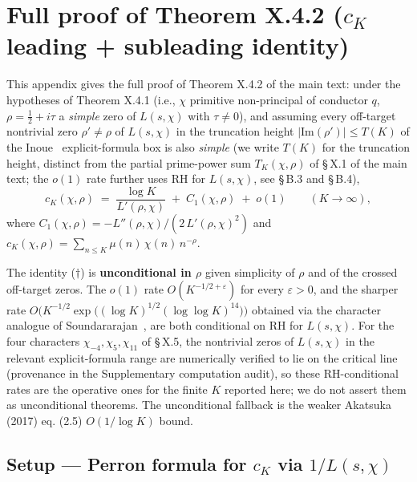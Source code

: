 \section{Full proof of Theorem X.4.2 ($c_K$ leading + subleading identity)}

This appendix gives the full proof of Theorem X.4.2 of the main text:
under the hypotheses of Theorem X.4.1 (i.e., \(\chi\) primitive
non-principal of conductor \(q\), \(\rho = \tfrac12 + i\tau\) a \emph{simple}
zero of \(L(s,\chi)\) with \(\tau \ne 0\)), and assuming every
off-target nontrivial zero \(\rho' \ne \rho\) of \(L(s,\chi)\) in the
truncation height \(|\mathrm{Im}(\rho')| \le T(K)\) of the Inoue~\cite{Inoue2021}
explicit-formula box is also \emph{simple} (we write \(T(K)\) for the
truncation height, distinct from the partial prime-power sum
\(T_K(\chi,\rho)\) of \S\,X.1 of the main text; the \(o(1)\) rate further
uses RH for \(L(s,\chi)\), see \S\,B.3 and \S\,B.4),
\begin{equation}
\label{eq:cK-appendix}
c_K(\chi,\rho) \;=\; \frac{\log K}{L'(\rho,\chi)} \;+\; C_1(\chi,\rho) \;+\; o(1)
\qquad (K \to \infty),
\tag{$\dagger$}
\end{equation}
where \(C_1(\chi,\rho) = -L''(\rho,\chi) / (2\,L'(\rho,\chi)^2)\) and
\(c_K(\chi,\rho) = \sum_{n \le K} \mu(n)\,\chi(n)\,n^{-\rho}\).

The identity (\(\dagger\)) is \textbf{unconditional in \(\rho\)} given
simplicity of \(\rho\) and of the crossed off-target zeros. The \(o(1)\) rate
\(O(K^{-1/2 + \varepsilon})\) for every \(\varepsilon > 0\), and the
sharper rate
\(O\bigl(K^{-1/2} \exp\bigl((\log K)^{1/2}(\log\log K)^{14}\bigr)\bigr)\)
obtained via the character analogue of Soundararajan~\cite[Theorem~1]{Soundararajan2009},
are both conditional on RH for \(L(s, \chi)\). For the four characters
\(\chi_{-4}, \chi_5, \chi_{11}\) of \S\,X.5, the nontrivial zeros of
\(L(s,\chi)\) in the relevant explicit-formula range are numerically
verified to lie on the critical line (provenance in the Supplementary
computation audit), so these RH-conditional rates are the operative
ones for the finite \(K\) reported here; we do not assert them as
unconditional theorems. The unconditional fallback is the weaker
Akatsuka (2017) eq. (2.5) \(O(1/\log K)\) bound.

\subsection{Setup --- Perron formula for \(c_K\) via \(1/L(s, \chi)\)}

